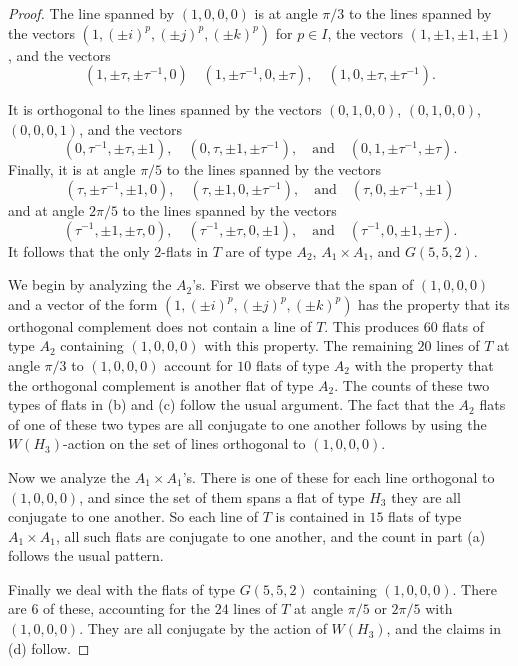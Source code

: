 \documentclass[11pt, reqno]{amsart}
\numberwithin{equation}{section}
\theoremstyle{definition}
\theoremstyle{plain}
\begin{document}
\begin{proof}
The line spanned by $(1,0,0,0)$ is at angle $\pi/3$ to the lines spanned by the vectors $(1,(\pm i)^p,(\pm j)^p, (\pm k)^p)$ for $p \in I$, the vectors $(1,\pm 1, \pm 1, \pm 1)$, and the vectors 
$$(1,\pm \tau, \pm \tau^{-1},0) \quad (1, \pm \tau^{-1},0,\pm \tau), \quad (1,0, \pm \tau,\pm \tau^{-1}).$$

It is orthogonal to the lines spanned by the vectors $(0,1,0,0)$, $(0,1,0,0)$, $(0,0,0,1)$, and the vectors 
$$(0,\tau^{-1}, \pm \tau, \pm 1), \quad (0,\tau, \pm 1, \pm \tau^{-1}), \quad \text{and} \quad (0,1,\pm \tau^{-1}, \pm \tau).$$ Finally, it is at angle $\pi/5$ to the lines spanned by the vectors
$$(\tau, \pm \tau^{-1}, \pm 1, 0), \quad (\tau, \pm 1, 0, \pm \tau^{-1}), \quad \text{and} \quad (\tau,0,\pm \tau^{-1}, \pm 1)$$ and at angle $2 \pi /5$ to the lines spanned by the vectors
$$(\tau^{-1}, \pm 1, \pm \tau, 0), \quad (\tau^{-1}, \pm \tau, 0 , \pm 1), \quad \text{and} \quad (\tau^{-1},0, \pm 1, \pm \tau).$$ It follows that the only $2$-flats in $T$ are of type $A_2$, $A_1 \times A_1$, and $G(5,5,2)$. 

We begin by analyzing the $A_2$'s. First we observe that the span of $(1,0,0,0)$ and a vector of the form $(1,(\pm i)^p,(\pm j)^p,(\pm k)^p)$ has the property that its orthogonal complement does not contain a line of $T$. This produces $60$ flats of type $A_2$ containing $(1,0,0,0)$ with this property. The remaining $20$ lines of $T$ at angle $\pi/3$ to $(1,0,0,0)$ account for $10$ flats of type $A_2$ with the property that the orthogonal complement is another flat of type $A_2$. The counts of these two types of flats in (b) and (c) follow the usual argument. The fact that the $A_2$ flats of one of these two types are all conjugate to one another follows by using the $W(H_3)$-action on the set of lines orthogonal to $(1,0,0,0)$. 

Now we analyze the $A_1 \times A_1$'s. There is one of these for each line orthogonal to $(1,0,0,0)$, and since the set of them spans a flat of type $H_3$ they are all conjugate to one another. So each line of $T$ is contained in $15$ flats of type $A_1 \times A_1$, all such flats are conjugate to one another, and the count in part (a) follows the usual pattern.

Finally we deal with the flats of type $G(5,5,2)$ containing $(1,0,0,0)$. There are $6$ of these, accounting for the $24$ lines of $T$ at angle $\pi/5$ or $2 \pi /5$ with $(1,0,0,0)$. They are all conjugate by the action of $W(H_3)$, and the claims in (d) follow.
\end{proof}
\end{document}
